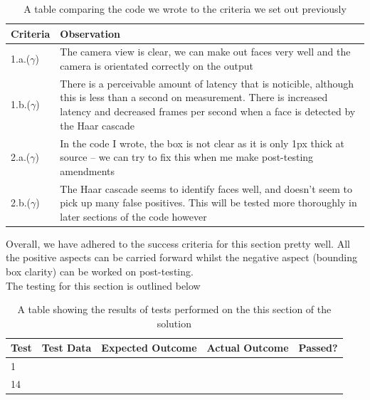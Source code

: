 \documentclass[9pt]{article}
\begin{document}
\begin{table}[H]
	\centering
	\begin{tabularx}{\textwidth}{lX}
		\textbf{Criteria} & \textbf{Observation}                                                                                                                                                                                                   \\ \midrule
		1.a.($ \gamma $)  & The camera view is clear, we can make out faces very well and the camera is orientated correctly on the output                                                                                                         \\
		1.b.($ \gamma $)  & There is a perceivable amount of latency that is noticible, although this is less than a second on measurement. There is increased latency and decreased frames per second when a face is detected by the Haar cascade \\
		2.a.($ \gamma $)  & In the code I wrote, the box is not clear as it is only 1px thick at source -- we can try to fix this when me make post-testing amendments                                                                             \\
		2.b.($ \gamma $)  & The Haar cascade seems to identify faces well, and doesn't seem to pick up many false positives. This will be tested more thoroughly in later sections of the code however \\ \bottomrule
	\end{tabularx}
	\caption{A table comparing the code we wrote to the criteria we set out previously}
	\label{tab_successCameraTest}
\end{table}
Overall, we have adhered to the success criteria for this section pretty well. All the positive aspects can be carried forward whilst the negative aspect (bounding box clarity) can be worked on post-testing.\\
The testing for this section is outlined below
\begin{table}[H]
	\centering
	\begin{tabularx}{\textwidth}{lXXXl}
		Test & \textbf{Test Data} & \textbf{Expected Outcome} & \textbf{Actual Outcome} & \textbf{Passed?} \\ \midrule
		1    &                    &                  &                &         \\
		14   &                    &                  &                &         \\ \bottomrule
	\end{tabularx}
	\caption{A table showing the results of tests performed on the this section of the solution}
	\label{tab_testingCameraTest}
\end{table}
\end{document}
